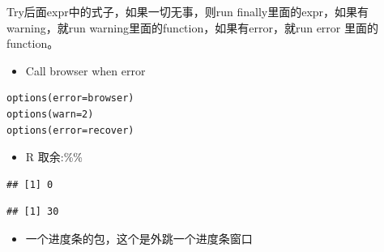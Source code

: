 \documentclass[
]{book}
\newenvironment{Shaded}{\begin{snugshade}}{\end{snugshade}}
\newcommand{\DecValTok}[1]{\textcolor[rgb]{0.00,0.00,0.81}{#1}}
\newcommand{\OperatorTok}[1]{\textcolor[rgb]{0.81,0.36,0.00}{\textbf{#1}}}
\providecommand{\tightlist}{%
  \setlength{\itemsep}{0pt}\setlength{\parskip}{0pt}}
\theoremstyle{definition}
\theoremstyle{definition}
\theoremstyle{definition}
\theoremstyle{remark}
\begin{document}
Try后面expr中的式子，如果一切无事，则run finally里面的expr，如果有warning，就run warning里面的function，如果有error，就run error 里面的function。

\begin{itemize}
\tightlist
\item
  Call browser when error
\end{itemize}

\begin{verbatim}
options(error=browser)
options(warn=2)
options(error=recover)
\end{verbatim}

\begin{itemize}
\tightlist
\item
  R 取余:\%\%
\end{itemize}

\begin{Shaded}
\end{Shaded}

\begin{verbatim}
## [1] 0
\end{verbatim}

\begin{Shaded}
\end{Shaded}

\begin{verbatim}
## [1] 30
\end{verbatim}

\begin{itemize}
\tightlist
\item
  一个进度条的包，这个是外跳一个进度条窗口
\end{itemize}
\end{document}
